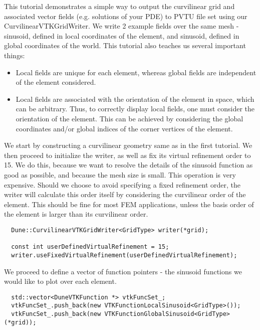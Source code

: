 This tutorial demonstrates a simple way to output the curvilinear grid and associated vector fields (e.g. solutions of your PDE) to PVTU file set using our CurvilinearVTKGridWriter. We write 2 example fields over the same mesh - sinusoid, defined in local coordinates of the element, and sinusoid, defined in global coordinates of the world. This tutorial also teaches us several important things:
\begin{itemize}
	\item Local fields are unique for each element, whereas global fields are independent of the element considered.
	\item Local fields are associated with the orientation of the element in space, which can be arbitrary. Thus, to correctly display local fields, one must consider the orientation of the element. This can be achieved by considering the global coordinates and/or global indices of the corner vertices of the element.
\end{itemize}

\noindent
We start by constructing a curvilinear geometry same as in the first tutorial. We then proceed to initialize the writer, as well as fix its virtual refinement order to 15. We do this, because we want to resolve the details of the sinusoid function as good as possible, and because the mesh size is small. This operation is very expensive. Should we choose to avoid specifying a fixed refinement order, the writer will calculate this order itself by considering the curvilinear order of the element. This should be fine for most FEM applications, unless the basis order of the element is larger than its curvilinear order. \\

\begin{mybox}
\begin{lstlisting}    
  Dune::CurvilinearVTKGridWriter<GridType> writer(*grid);
    
  const int userDefinedVirtualRefinement = 15;
  writer.useFixedVirtualRefinement(userDefinedVirtualRefinement);
\end{lstlisting}
\end{mybox}

\noindent
We proceed to define a vector of function pointers - the sinusoid functions we would like to plot over each element. \\

\begin{mybox}
\begin{lstlisting}    
  std::vector<DuneVTKFunction *> vtkFuncSet_;
  vtkFuncSet_.push_back(new VTKFunctionLocalSinusoid<GridType>());
  vtkFuncSet_.push_back(new VTKFunctionGlobalSinusoid<GridType>(*grid));
\end{lstlisting}
\end{mybox}
	
